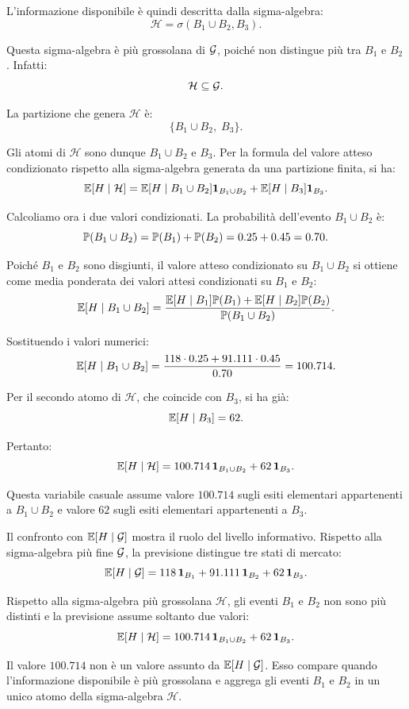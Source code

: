 L'informazione disponibile \`{e} quindi descritta dalla sigma-algebra:
\[
\mathcal{H}
=
\sigma(B_1\cup B_2,B_3).
\]

Questa sigma-algebra \`{e} pi\`{u} grossolana di $\mathcal{G}$, poich\'{e}
non distingue pi\`{u} tra $B_1$ e $B_2$. Infatti:
\[
\mathcal{H}\subseteq\mathcal{G}.
\]

La partizione che genera $\mathcal{H}$ \`{e}:
\[
\{B_1\cup B_2,\;B_3\}.
\]

Gli atomi di $\mathcal{H}$ sono dunque $B_1\cup B_2$ e $B_3$. Per la formula
del valore atteso condizionato rispetto alla sigma-algebra generata da una
partizione finita, si ha:
\[
\mathbb{E}[H\mid\mathcal{H}]
=
\mathbb{E}[H\mid B_1\cup B_2]\mathbf{1}_{B_1\cup B_2}
+
\mathbb{E}[H\mid B_3]\mathbf{1}_{B_3}.
\]

Calcoliamo ora i due valori condizionati. La probabilit\`{a} dell'evento
$B_1\cup B_2$ \`{e}:
\[
\mathbb{P}(B_1\cup B_2)
=
\mathbb{P}(B_1)+\mathbb{P}(B_2)
=
0.25+0.45
=
0.70.
\]

Poich\'{e} $B_1$ e $B_2$ sono disgiunti, il valore atteso condizionato su
$B_1\cup B_2$ si ottiene come media ponderata dei valori attesi condizionati
su $B_1$ e $B_2$:
\[
\mathbb{E}[H\mid B_1\cup B_2]
=
\frac{
\mathbb{E}[H\mid B_1]\mathbb{P}(B_1)
+
\mathbb{E}[H\mid B_2]\mathbb{P}(B_2)
}
{
\mathbb{P}(B_1\cup B_2)
}.
\]

Sostituendo i valori numerici:
\[
\mathbb{E}[H\mid B_1\cup B_2]
=
\frac{
118\cdot0.25
+
91.111\cdot0.45
}
{0.70}
=
100.714.
\]

Per il secondo atomo di $\mathcal{H}$, che coincide con $B_3$, si ha gi\`{a}:
\[
\mathbb{E}[H\mid B_3]
=
62.
\]

Pertanto:
\[
\mathbb{E}[H\mid\mathcal{H}]
=
100.714\,\mathbf{1}_{B_1\cup B_2}
+
62\,\mathbf{1}_{B_3}.
\]

Questa variabile casuale assume valore $100.714$ sugli esiti elementari
appartenenti a $B_1\cup B_2$ e valore $62$ sugli esiti elementari
appartenenti a $B_3$.

Il confronto con $\mathbb{E}[H\mid\mathcal{G}]$ mostra il ruolo del livello
informativo. Rispetto alla sigma-algebra pi\`{u} fine $\mathcal{G}$, la
previsione distingue tre stati di mercato:
\[
\mathbb{E}[H\mid\mathcal{G}]
=
118\,\mathbf{1}_{B_1}
+
91.111\,\mathbf{1}_{B_2}
+
62\,\mathbf{1}_{B_3}.
\]

Rispetto alla sigma-algebra pi\`{u} grossolana $\mathcal{H}$, gli eventi
$B_1$ e $B_2$ non sono pi\`{u} distinti e la previsione assume soltanto due
valori:
\[
\mathbb{E}[H\mid\mathcal{H}]
=
100.714\,\mathbf{1}_{B_1\cup B_2}
+
62\,\mathbf{1}_{B_3}.
\]

Il valore $100.714$ non \`{e} un valore assunto da
$\mathbb{E}[H\mid\mathcal{G}]$. Esso compare quando l'informazione disponibile
\`{e} pi\`{u} grossolana e aggrega gli eventi $B_1$ e $B_2$ in un unico atomo
della sigma-algebra $\mathcal{H}$.

